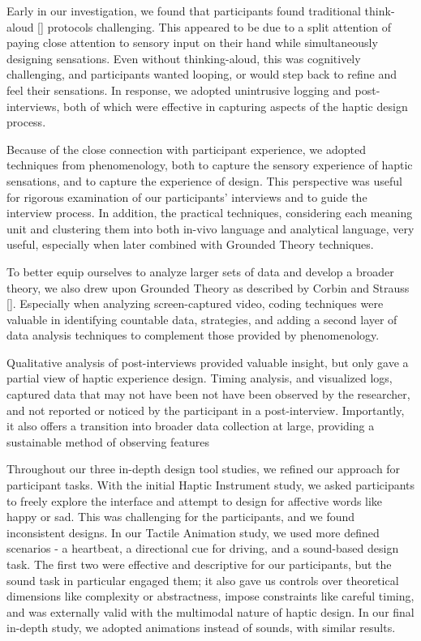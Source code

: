 Early in our investigation, we found that participants found traditional think-aloud [] protocols challenging.
This appeared to be due to a split attention of paying close attention to sensory input on their hand while simultaneously designing sensations.
Even without thinking-aloud, this was cognitively challenging, and participants wanted looping, or would step back to refine and feel their sensations.
In response, we adopted unintrusive logging and post-interviews, both of which were effective in capturing aspects of the haptic design process. 

Because of the close connection with participant experience, we adopted techniques from phenomenology, both to capture the sensory experience of haptic sensations, and to capture the experience of design.
This perspective was useful for rigorous examination of our participants' interviews and to guide the interview process.
In addition, the practical techniques, considering each meaning unit and clustering them into both in-vivo language and analytical language, very useful, especially when later combined with Grounded Theory techniques.

To better equip ourselves to analyze larger sets of data and develop a broader theory, we also drew upon Grounded Theory as described by Corbin and Strauss [].
Especially when analyzing screen-captured video, coding techniques were valuable in identifying countable data, strategies, and adding a second layer of data analysis techniques to complement those provided by phenomenology.

Qualitative analysis of post-interviews provided valuable insight, but only gave a partial view of haptic experience design.
Timing analysis, and visualized logs, captured data that may not have been not have been observed by the researcher, and not reported or noticed by the participant in a post-interview.
Importantly, it also offers a transition into broader data collection at large, providing a sustainable method of observing features


Throughout our three in-depth design tool studies, we refined our approach for participant tasks.
With the initial Haptic Instrument study, we asked participants to freely explore the interface and attempt to design for affective words like happy or sad.
This was challenging for the participants, and we found inconsistent designs. 
In our Tactile Animation study, we used more defined scenarios - a heartbeat, a directional cue for driving, and a sound-based design task.
The first two were effective and descriptive for our participants, but the sound task in particular engaged them; it also gave us controls over theoretical dimensions like complexity or abstractness, impose constraints like careful timing, and was externally valid with the multimodal nature of haptic design.
In our final in-depth study, we adopted animations instead of sounds, with similar results.

